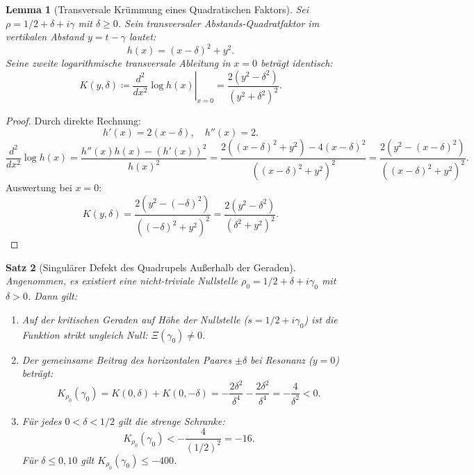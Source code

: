 \documentclass[11pt,a4paper]{article}
\newtheorem{theorem}{Satz}[section]
\newtheorem{lemma}[theorem]{Lemma}
\theoremstyle{definition}
\theoremstyle{remark}
\begin{document}
\begin{lemma}[Transversale Krümmung eines Quadratischen Faktors]
\label{lem:curvatura_factor_cuad}
Sei $\rho = 1/2 + \delta + i\gamma$ mit $\delta \ge 0$. Sein transversaler Abstands-Quadratfaktor im vertikalen Abstand $y = t - \gamma$ lautet:
\begin{equation}
h(x) = (x - \delta)^2 + y^2.
\end{equation}
Seine zweite logarithmische transversale Ableitung in $x = 0$ beträgt identisch:
\begin{equation}
K(y, \delta) \coloneqq \left.\frac{d^2}{dx^2}\log h(x)\right|_{x=0} = \frac{2(y^2 - \delta^2)}{(y^2 + \delta^2)^2}.
\end{equation}
\end{lemma}

\begin{proof}
Durch direkte Rechnung:
\[
h'(x) = 2(x - \delta), \quad h''(x) = 2.
\]
\[
\frac{d^2}{dx^2}\log h(x) = \frac{h''(x) h(x) - (h'(x))^2}{h(x)^2} = \frac{2((x - \delta)^2 + y^2) - 4(x - \delta)^2}{((x - \delta)^2 + y^2)^2} = \frac{2(y^2 - (x - \delta)^2)}{((x - \delta)^2 + y^2)^2}.
\]
Auswertung bei $x = 0$:
\[
K(y, \delta) = \frac{2(y^2 - (-\delta)^2)}{((-\delta)^2 + y^2)^2} = \frac{2(y^2 - \delta^2)}{(\delta^2 + y^2)^2}.
\]
\end{proof}

\begin{theorem}[Singulärer Defekt des Quadrupels Außerhalb der Geraden]
\label{thm:defecto_cuadruplete_experto}
Angenommen, es existiert eine nicht-triviale Nullstelle $\rho_0 = 1/2 + \delta + i\gamma_0$ mit $\delta > 0$. Dann gilt:
\begin{enumerate}
    \item Auf der kritischen Geraden auf Höhe der Nullstelle ($s = 1/2 + i\gamma_0$) ist die Funktion strikt ungleich Null: $\Xi(\gamma_0) \neq 0$.
    \item Der gemeinsame Beitrag des horizontalen Paares $\pm \delta$ bei Resonanz ($y = 0$) beträgt:
    \begin{equation}
    K_{\rho_0}(\gamma_0) = K(0, \delta) + K(0, -\delta) = -\frac{2\delta^2}{\delta^4} - \frac{2\delta^2}{\delta^4} = -\frac{4}{\delta^2} < 0.
    \end{equation}
    \item Für jedes $0 < \delta < 1/2$ gilt die strenge Schranke:
    \begin{equation}
    K_{\rho_0}(\gamma_0) < -\frac{4}{(1/2)^2} = -16.
    \end{equation}
    Für $\delta \le 0{,}10$ gilt $K_{\rho_0}(\gamma_0) \le -400$.
\end{enumerate}
\end{theorem}
\end{document}
